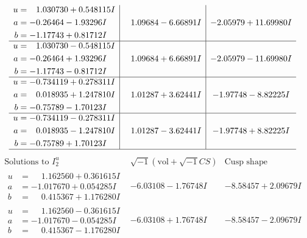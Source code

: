 \documentclass[1p]{elsarticle_modified}
\theoremstyle{definition}
\newcommand{\I}{\sqrt{-1}}
\begin{document}
$$\begin{array}{c|c|c}
\begin{aligned}
u &= \phantom{-}1.030730 + 0.548115 I \\
a &= -0.26464 - 1.93296 I \\
b &= -1.17743 + 0.81712 I\end{aligned}
 & \phantom{-}1.09684 - 6.66891 I & -2.05979 + 11.69980 I \\ \hline\begin{aligned}
u &= \phantom{-}1.030730 - 0.548115 I \\
a &= -0.26464 + 1.93296 I \\
b &= -1.17743 - 0.81712 I\end{aligned}
 & \phantom{-}1.09684 + 6.66891 I & -2.05979 - 11.69980 I \\ \hline\begin{aligned}
u &= -0.734119 + 0.278311 I \\
a &= \phantom{-}0.018935 + 1.247810 I \\
b &= -0.75789 - 1.70123 I\end{aligned}
 & \phantom{-}1.01287 + 3.62441 I & -1.97748 - 8.82225 I \\ \hline\begin{aligned}
u &= -0.734119 - 0.278311 I \\
a &= \phantom{-}0.018935 - 1.247810 I \\
b &= -0.75789 + 1.70123 I\end{aligned}
 & \phantom{-}1.01287 - 3.62441 I & -1.97748 + 8.82225 I\\
 \hline 
 \end{array}$$\newpage$$\begin{array}{c|c|c}  
\text{Solutions to }I^u_{2}& \I (\text{vol} + \sqrt{-1}CS) & \text{Cusp shape}\\
 \hline 
\begin{aligned}
u &= \phantom{-}1.162560 + 0.361615 I \\
a &= -1.017670 + 0.054285 I \\
b &= \phantom{-}0.415367 + 1.176280 I\end{aligned}
 & -6.03108 - 1.76748 I & -8.58457 + 2.09679 I \\ \hline\begin{aligned}
u &= \phantom{-}1.162560 - 0.361615 I \\
a &= -1.017670 - 0.054285 I \\
b &= \phantom{-}0.415367 - 1.176280 I\end{aligned}
 & -6.03108 + 1.76748 I & -8.58457 - 2.09679 I \\ \hline\begin{aligned}

\end{aligned}
\end{array}$$
\end{document}
